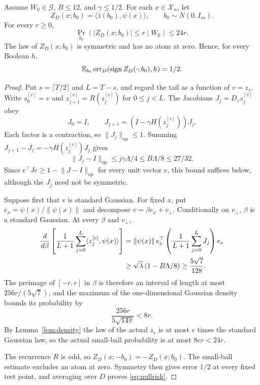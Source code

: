 \documentclass[11pt,letterpaper,pmlr,twoside]{jmlr}
\newcommand{\X}{\mathcal X}\newcommand{\Hc}{\mathcal H}
\newcommand{\err}{\operatorname{err}}\newcommand{\Risk}{\mathcal E}
\newcommand{\ip}[2]{\langle #1,#2\rangle}\newcommand{\norm}[1]{\lVert #1\rVert}
\newcommand{\op}{\mathrm{op}}\newcommand{\Unif}{\operatorname{Unif}}
\newcommand{\Gcal}{\mathcal G}\newcommand{\Bfr}{\mathfrak B}
\begin{document}
\begin{lemma}
\label{lem:smallball}
Assume $W_0\in\Gcal$, $B\le12$, and $\gamma\le1/2$. For each $x\in\X_n$, let
\[
 Z_D(x;b_0)=\ip{\bar z(b_0)}{\psi(x)},\qquad b_0\sim N(0,I_m).
\]
For every $r\ge0$,
\begin{equation}
 \Pr_{b_0}(|Z_D(x;b_0)|\le r\mid W_0)\le24r.
 \label{eq:smallball}
\end{equation}
The law of $Z_D(x;b_0)$ is symmetric and has no atom at zero. Hence, for every Boolean $h$,
\begin{equation}
 \E_{b_0}\err_D(\sgn Z_D(\cdot;b_0),h)=1/2.
 \label{eq:nullrisk}
\end{equation}
\end{lemma}
\begin{proof}
Put $s=\lceil T/2\rceil$ and $L=T-s$, and regard the tail as a function of $v=z_s$. Write $z^{[v]}_0=v$ and $z^{[v]}_{j+1}=R(z^{[v]}_j)$ for $0\le j<L$. The Jacobians $J_j=D_vz^{[v]}_j$ obey
\[
 J_0=I,\qquad J_{j+1}=(I-\gamma H(z^{[v]}_j))J_j.
\]
Each factor is a contraction, so $\norm{J_j}_{\op}\le1$. Summing
$J_{j+1}-J_j=-\gamma H(z^{[v]}_j)J_j$ gives
\begin{equation}
 \norm{J_j-I}_{\op}\le j\gamma\Lambda/4
       \le B\Lambda/8\le27/32.
 \label{eq:Jac}
\end{equation}
Since $e^\top Je\ge1-\norm{J-I}_{\op}$ for every unit vector $e$, this bound suffices below, although the $J_j$ need not be symmetric.

Suppose first that $v$ is standard Gaussian. For fixed $x$, put $e_x=\psi(x)/\norm{\psi(x)}$ and decompose $v=\beta e_x+v_\perp$. Conditionally on $v_\perp$, $\beta$ is a standard Gaussian. At every $\beta$ and $v_\perp$,
\begin{align}
 \frac{d}{d\beta}\left[\frac1{L+1}\sum_{j=0}^L
             \ip{z^{[v]}_j}{\psi(x)}\right]
 &=\norm{\psi(x)}\,e_x^\top
     \left(\frac1{L+1}\sum_{j=0}^L J_j\right)e_x\notag\\
 &\ge\sqrt\lambda\,(1-B\Lambda/8)
 \ge\frac{5\sqrt7}{128}.
 \label{eq:derivative}
\end{align}
The preimage of $[-r,r]$ in $\beta$ is therefore an interval of length at most $256r/(5\sqrt7)$, and the maximum of the one-dimensional Gaussian density bounds its probability by
\[
 \frac{256r}{5\sqrt{14\pi}}<8r.
\]
By Lemma~\ref{lem:density} the law of the actual $z_s$ is at most $e$ times the standard Gaussian law, so the actual small-ball probability is at most $8er<24r$.

The recurrence $R$ is odd, so $Z_D(x;-b_0)=-Z_D(x;b_0)$. The small-ball estimate excludes an atom at zero. Symmetry then gives error $1/2$ at every fixed test point, and averaging over $D$ proves \eqref{eq:nullrisk}.
\end{proof}
\end{document}

